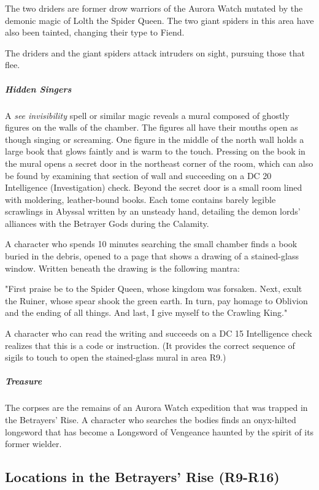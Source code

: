 \documentclass[10pt,a4paper,twoside,fancy,bg=print,twocolumn,openany,nodeprecatedcode]{dndbook}
\begin{document}
The two driders are former drow warriors of the Aurora Watch mutated by the demonic magic of Lolth the Spider Queen. The two giant spiders in this area have also been tainted, changing their type to Fiend.

The driders and the giant spiders attack intruders on sight, pursuing those that flee.

\subparagraph{Hidden Singers}
A \textit{see invisibility} spell or similar magic reveals a mural composed of ghostly figures on the walls of the chamber. The figures all have their mouths open as though singing or screaming. One figure in the middle of the north wall holds a large book that glows faintly and is warm to the touch. Pressing on the book in the mural opens a secret door in the northeast corner of the room, which can also be found by examining that section of wall and succeeding on a DC 20 Intelligence (Investigation) check. Beyond the secret door is a small room lined with moldering, leather-bound books. Each tome contains barely legible scrawlings in Abyssal written by an unsteady hand, detailing the demon lords' alliances with the Betrayer Gods during the Calamity.

A character who spends 10 minutes searching the small chamber finds a book buried in the debris, opened to a page that shows a drawing of a stained-glass window. Written beneath the drawing is the following mantra:

\begin{DndReadAloud}{}
"First praise be to the Spider Queen, whose kingdom was forsaken. Next, exult the Ruiner, whose spear shook the green earth. In turn, pay homage to Oblivion and the ending of all things. And last, I give myself to the Crawling King."

\end{DndReadAloud}

A character who can read the writing and succeeds on a DC 15 Intelligence check realizes that this is a code or instruction. (It provides the correct sequence of sigils to touch to open the stained-glass mural in area R9.)

\subparagraph{Treasure}
The corpses are the remains of an Aurora Watch expedition that was trapped in the Betrayers' Rise. A character who searches the bodies finds an onyx-hilted longsword that has become a Longsword of Vengeance haunted by the spirit of its former wielder.

\subsection{Locations in the Betrayers' Rise (R9-R16)}
\end{document}
